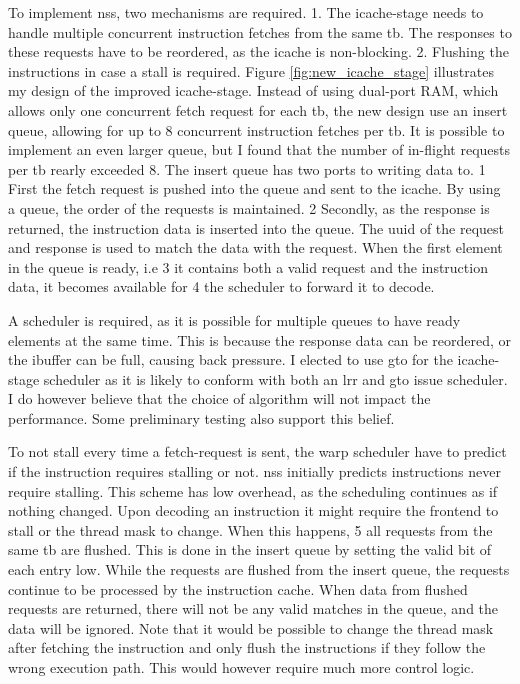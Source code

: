 To implement \acrshort{nss}, two mechanisms are required. 1. The icache-stage needs to handle multiple concurrent instruction fetches from the same \acrshort{tb}. The responses to these requests have to be reordered, as the icache is non-blocking. 2. Flushing the instructions in case a stall is required. Figure \ref{fig:new_icache_stage} illustrates my design of the improved icache-stage. Instead of using dual-port RAM, which allows only one concurrent fetch request for each \acrshort{tb}, the new design use an insert queue, allowing for up to 8 concurrent instruction fetches per \acrshort{tb}. It is possible to implement an even larger queue, but I found that the number of in-flight requests per \acrshort{tb} rearly exceeded 8. The insert queue has two ports to writing data to. \textcircled{\small{1}} First the fetch request is pushed into the queue and sent to the icache. By using a queue, the order of the requests is maintained. \textcircled{\small{2}} Secondly, as the response is returned, the instruction data is inserted into the queue. The \acrshort{uuid} of the request and response is used to match the data with the request. When the first element in the queue is ready, i.e \textcircled{\small{3}} it contains both a valid request and the instruction data, it becomes available for \textcircled{\small{4}} the scheduler to forward it to decode. 

A scheduler is required, as it is possible for multiple queues to have ready elements at the same time. This is because the response data can be reordered, or the ibuffer can be full, causing back pressure. I elected to use \acrshort{gto} for the icache-stage scheduler as it is likely to conform with both an \acrshort{lrr} and \acrshort{gto} issue scheduler. I do however believe that the choice of algorithm will not impact the performance. Some preliminary testing also support this belief.

To not stall every time a fetch-request is sent, the warp scheduler have to predict if the instruction requires stalling or not. \acrshort{nss} initially predicts instructions never require stalling. This scheme has low overhead, as the scheduling continues as if nothing changed. Upon decoding an instruction it might require the frontend to stall or the thread mask to change. When this happens, \textcircled{\small{5}} all requests from the same \acrshort{tb} are flushed. This is done in the insert queue by setting the valid bit of each entry low. While the requests are flushed from the insert queue, the requests continue to be processed by the instruction cache. When data from flushed requests are returned, there will not be any valid matches in the queue, and the data will be ignored. Note that it would be possible to change the thread mask after fetching the instruction and only flush the instructions if they follow the wrong execution path. This would however require much more control logic.  

